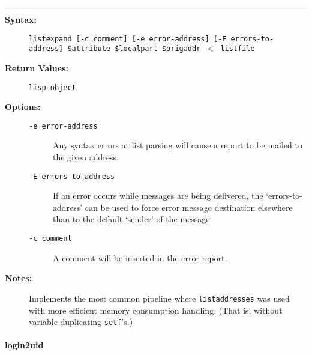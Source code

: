 \hrule
\begin{description}
\item[{\bf Syntax:}] \mbox{}

{\tt listexpand [-c comment] [-e error-address] [-E errors-to-address] \$attribute \$localpart \$origaddr {\(<\)} listfile}

\item[{\bf Return Values:}] \mbox{}

{\tt lisp-object}

\item[{\bf Options:}] \mbox{}

\begin{description}
\item[{\tt -e error-address}] \mbox{}

Any syntax errors at list 
parsing will cause a report to be mailed to the given address.

\item[{\tt -E errors-to-address}] \mbox{}

If an error occurs while messages 
are being delivered, the `errors-to-address' can be used to force error 
message destination elsewhere than to the default `sender' of the message.

\item[{\tt -c comment}] \mbox{}

A comment will be inserted in the error report.

\end{description}


\item[{\bf Notes:}] \mbox{}

Implements the most common pipeline where 
{\tt listaddresses} was used with more efficient memory consumption 
handling. (That is, without variable duplicating {\tt setf}'s.)

\end{description}


\vspace {2pt}


\paragraph{login2uid}

